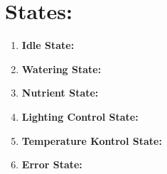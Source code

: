 \documentclass[12pt]{article}
\begin{document}
\section{States:}
\begin{enumerate}
  \item\textbf{Idle State:}
  \item\textbf{Watering State:}
  \item\textbf{Nutrient State:}
  \item\textbf{Lighting Control State:}
  \item\textbf{Temperature Kontrol State:}
  \item\textbf{Error State:}
\end{enumerate}

 

 
\end{document}

